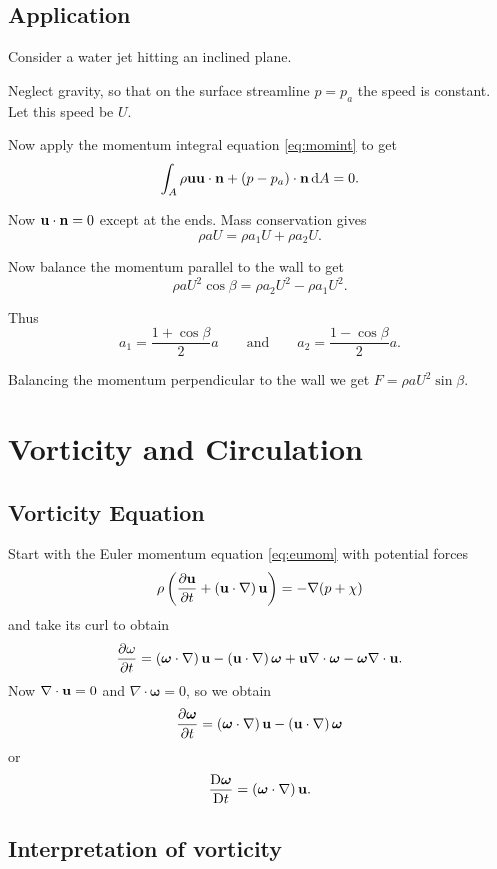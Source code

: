 \documentclass{notes}
\newcommand{\matd}[1]{\DDt{#1}}
\newcommand{\bso}{\boldsymbol\omega}
\newcommand{\grad}{\nabla}
\newcommand{\divr}{\nabla\cdot}
\newcommand{\dgrad}[2]{\left(#1\cdot\nabla\right)#2}
\begin{document}
\subsection{Application}

Consider a water jet hitting an inclined plane.

\vspace{1.5in}

Neglect gravity, so that on the surface streamline $p=p_a$ the speed
is constant.  Let this speed be $U$.

Now apply the momentum integral equation \eqref{eq:momint} to get
\[
\int_A \rho \mathbf{u} \mathbf{u} \cdot \mathbf{n} + (p - p_a) \cdot \mathbf{n}\,\mathrm{d} A = 0. 
\]

Now $\mathbf{u} \cdot \mathbf{n} = 0$ except at the ends.  Mass conservation gives
\[
\rho a U = \rho a_1 U + \rho a_2 U.
\]

Now balance the momentum parallel to the wall to get
\[
\rho a U^2 \cos \beta = \rho a_2 U^2 - \rho a_1 U^2.
\]

Thus
\[
a_1 = \frac{1 + \cos \beta}{2} a \qquad \text{and} \qquad
a_2 = \frac{1 - \cos \beta}{2} a.
\]

Balancing the momentum perpendicular to the wall we get
$F = \rho a U^2 \sin \beta$.

\section{Vorticity and Circulation}

\subsection{Vorticity Equation}

Start with the Euler momentum equation \eqref{eq:eumom} with potential forces
\[
\rho \left( \pd{\vu}{t} + \dgrad{\vu}{\vu} \right) =-\grad{(p + \chi)}
\]
and take its curl to obtain
\[
\pd{\omega}{t} = \dgrad{\bso}{\vu} - \dgrad{\vu}{\bso} + \vu \divr{\bso}
- \bso\divr{\vu}.
\]
Now $\divr{\vu} = 0$ and $\divr{\bso} = 0$, so we obtain
\[
\pd{\bso}{t} = \dgrad{\bso}{\vu} - \dgrad{\vu}{\bso}
\] or
\begin{equation}\label{eq:vorteq}
\matd{\bso} = \dgrad{\bso}{\vu}.
\end{equation}

\subsection{Interpretation of vorticity}
\end{document}
